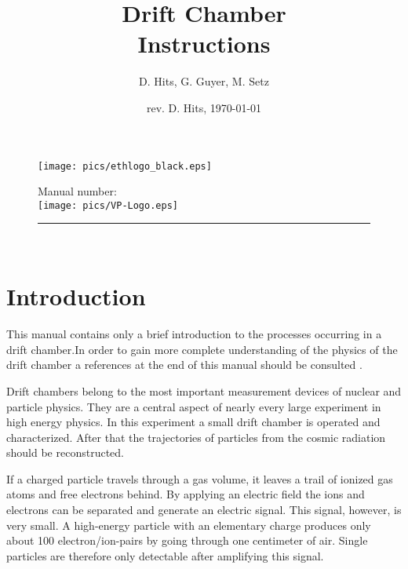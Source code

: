 \documentclass[12pt]{article}
\begin{document}
\begin{figure}
\begin{minipage}{0.5\linewidth}
\begin{flushleft}
\texttt{[image: pics/ethlogo\_black.eps]}
\end{flushleft}
\end{minipage}
\hspace{0.05cm}
\begin{minipage}{0.5\linewidth}
\begin{flushright}
Manual number:\hspace{2cm}\\[0.5cm]
\texttt{[image: pics/VP-Logo.eps]}
\end{flushright}
\end{minipage}
\hrule height 1pt\hfill \\[3cm]
\end{figure} 

\title{Drift Chamber\\ Instructions}
\author{D. Hits, G. Guyer, M. Setz}
\date{rev. D. Hits, \today}
\maketitle

\newpage
\section{Introduction}


This manual contains only a brief introduction to the processes occurring in a drift chamber.In order to gain more complete understanding of the physics of the drift chamber a references at the end of this manual should be consulted \cite{DriftChamberBook, knoll, NIMwiki}. 

Drift chambers belong to the most important measurement devices of nuclear and particle physics. They are a central aspect of nearly every large experiment in high energy physics. In this experiment a small drift chamber is operated and characterized. After that the trajectories of particles from the cosmic radiation should be reconstructed. 

If a charged particle travels through a gas volume, it leaves a trail of ionized gas atoms and free electrons behind. By applying an electric field the ions and electrons can be separated and generate an electric signal. This signal, however, is very small. A high-energy particle with an elementary charge produces only about 100 electron/ion-pairs by going through one centimeter of air. Single particles are therefore only detectable after amplifying this signal. 
\end{document}
